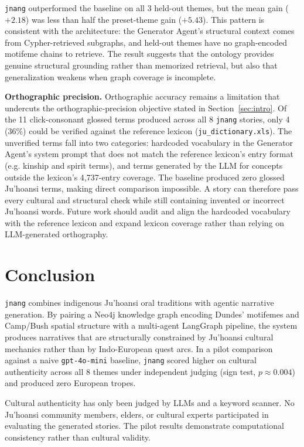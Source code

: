 \documentclass[pdflatex,sn-mathphys-num]{sn-jnl}%
\newcommand{\juhoansi}{\mbox{Ju\textbar{}'hoansi}}%
\theoremstyle{thmstyleone}%
\theoremstyle{thmstyletwo}%
\theoremstyle{thmstylethree}%
\begin{document}
\noindent  \texttt{jnang} outperformed the baseline on all 3 held-out themes, but the mean gain ($+2.18$) was less than half the preset-theme gain ($+5.43$). This pattern is consistent with the architecture: the Generator Agent's structural context comes from Cypher-retrieved subgraphs, and held-out themes have no graph-encoded motifeme chains to retrieve. The result suggests that the ontology provides genuine structural grounding rather than memorized retrieval, but also that generalization weakens when graph coverage is incomplete.

\noindent\textbf{Orthographic precision.} Orthographic accuracy remains a limitation that undercuts the orthographic-precision objective stated in Section~\ref{sec:intro}. Of the 11 click-consonant glossed terms produced across all 8 \texttt{jnang} stories, only 4 (36\%) could be verified against the reference lexicon (\texttt{ju\_dictionary.xls}). The unverified terms fall into two categories: hardcoded vocabulary in the Generator Agent's system prompt that does not match the reference lexicon's entry format (e.g. kinship and spirit terms), and terms generated by the LLM for concepts outside the lexicon's 4{,}737-entry coverage. The baseline produced zero glossed \juhoansi{} terms, making direct comparison impossible. A story can therefore pass every cultural and structural check while still containing invented or incorrect \juhoansi{} words. Future work should audit and align the hardcoded vocabulary with the reference lexicon and expand lexicon coverage rather than relying on LLM-generated orthography.




\section{Conclusion}\label{sec:conclusion}

\texttt{jnang} combines indigenous \juhoansi{} oral traditions with agentic narrative generation. By pairing a Neo4j knowledge graph encoding Dundes' motifemes and Camp/Bush spatial structure with a multi-agent LangGraph pipeline, the system produces narratives that are structurally constrained by \juhoansi{} cultural mechanics rather than by Indo-European quest arcs. In a pilot comparison against a naive \texttt{gpt-4o-mini} baseline, \texttt{jnang} scored higher on cultural authenticity across all 8 themes under independent judging (sign test, $p \approx 0.004$) and produced zero European tropes.

Cultural authenticity has only been judged by LLMs and a keyword scanner. No \juhoansi{} community members, elders, or cultural experts participated in evaluating the generated stories. The pilot results demonstrate computational consistency rather than cultural validity. %
\end{document}
